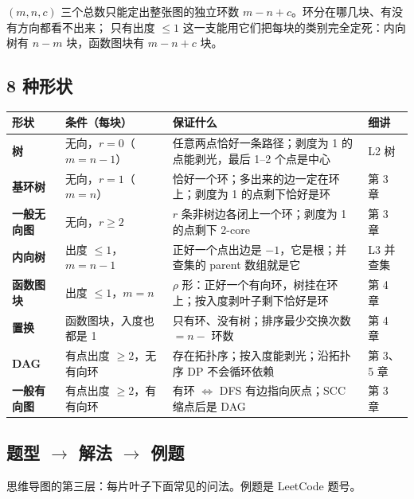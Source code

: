 \begin{principle}
$(m, n, c)$ 三个总数只能定出整张图的独立环数 $m - n + c$。环分在哪几块、有没有方向都看不出来；
只有出度 $\le 1$ 这一支能用它们把每块的类别完全定死：内向树有 $n - m$ 块，函数图块有 $m - n + c$ 块。
\end{principle}

\subsection{8 种形状}

{\small
\begin{tabularx}{\linewidth}{@{}>{\bfseries}l l X l@{}}
\toprule
\textbf{形状} & \textbf{条件（每块）} & \textbf{保证什么} & \textbf{细讲}\\
\midrule
树 & 无向，$r = 0$（$m = n-1$） & 任意两点恰好一条路径；剥度为 1 的点能剥光，最后 1–2 个点是中心 & L2 树\\
基环树 & 无向，$r = 1$（$m = n$） & 恰好一个环；多出来的边一定在环上；剥度为 1 的点剩下恰好是环 & 第 3 章\\
一般无向图 & 无向，$r \ge 2$ & $r$ 条非树边各闭上一个环；剥度为 1 的点剩下 2-core & 第 3 章\\
内向树 & 出度 $\le 1$，$m = n-1$ & 正好一个点出边是 $-1$，它是根；并查集的 parent 数组就是它 & L3 并查集\\
函数图块 & 出度 $\le 1$，$m = n$ & $\rho$ 形：正好一个有向环，树挂在环上；按入度剥叶子剩下恰好是环 & 第 4 章\\
置换 & 函数图块，入度也都是 1 & 只有环、没有树；排序最少交换次数 $= n -$ 环数 & 第 4 章\\
DAG & 有点出度 $\ge 2$，无有向环 & 存在拓扑序；按入度能剥光；沿拓扑序 DP 不会循环依赖 & 第 3、5 章\\
一般有向图 & 有点出度 $\ge 2$，有有向环 & 有环 $\Leftrightarrow$ DFS 有边指向灰点；SCC 缩点后是 DAG & 第 3 章\\
\bottomrule
\end{tabularx}
}

\subsection{\texorpdfstring{题型 $\to$ 解法 $\to$ 例题}{题型 → 解法 → 例题}}

思维导图的第三层：每片叶子下面常见的问法。例题是 LeetCode 题号。

